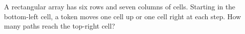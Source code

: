 A rectangular array has six rows and seven columns of cells. Starting in the bottom-left cell, a token moves one cell up or one cell right at each step. How many paths reach the top-right cell?
